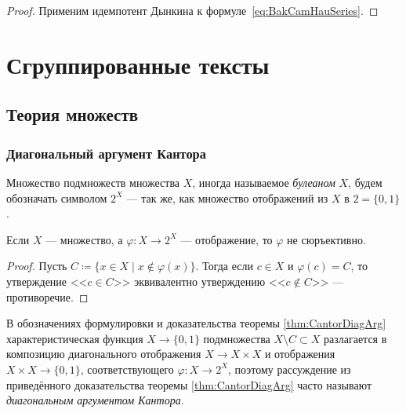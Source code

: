 \documentclass[
	extrafontsizes,
	11pt,
	hyphens,
]{memoir}
\begin{document}
\begin{proof}
Применим идемпотент Дынкина к формуле~\eqref{eq:BakCamHauSeries}.
\end{proof}




\part{Сгруппированные тексты}



\chapter{Теория множеств}




\section{Диагональный аргумент Кантора}

\begin{notation}
Множество подмножеств множества \(X\), иногда называемое \emph{булеаном} \(X\), будем обозначать символом \(2^X\) --- так же, как множество отображений из \(X\) в \(2 = \{0,1\}\).
\end{notation}

\begin{theorem}
\label{thm:CantorDiagArg}
Если \(X\) --- множество, а \(\varphi : X \to 2^X\) --- отображение, то \(\varphi\) не сюръективно.
\end{theorem}

\begin{proof}
Пусть
\(C \coloneqq \{x \in X \mid x \notin \varphi(x)\}\).
Тогда если \(c \in X\) и \(\varphi(c) = C\),
то утверждение <<\(c \in C\)>> эквивалентно утверждению <<\(c \notin C\)>> --- противоречие.
\end{proof}

\begin{remark}
В обозначениях формулировки и доказательства теоремы \ref{thm:CantorDiagArg} характеристическая функция \(X \to \{0,1\}\) подмножества \(X \setminus C  \subset X\) разлагается в композицию диагонального отображения \(X \to X \times X\) и отображения \(X \times X \to \{0,1\}\), соответствующего \(\varphi : X \to 2^X\),
поэтому рассуждение из приведённого доказательства теоремы \ref{thm:CantorDiagArg} часто называют \emph{диагональным аргументом Кантора}.
\end{remark}
\end{document}
